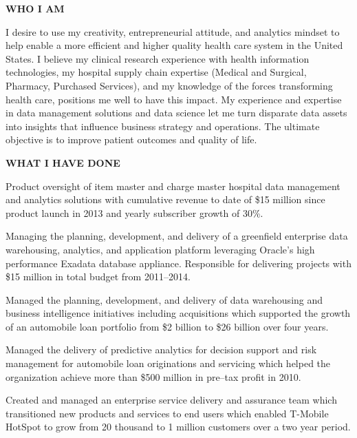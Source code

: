 \documentclass{article}
\newcommand{\sbt}{\,\begin{picture}(-1,1)(-1,-3)\circle*{3}\end{picture}\ }
\newenvironment{tightcenter}{%
  \setlength\topsep{0pt}
  \setlength\parskip{10pt}
  \begin{center}
}{%
  \end{center}
}
\begin{document}
\begin{tightcenter}
{\bfseries \large WHO I AM}
\end{tightcenter}

\noindent
I desire to use my creativity, entrepreneurial attitude, and analytics mindset to help enable a more efficient and higher quality health care system in the United States. I believe my clinical research experience with health information technologies, my hospital supply chain expertise (Medical and Surgical, Pharmacy, Purchased Services), and my knowledge of the forces transforming health care,  positions me well to have this impact. My experience and expertise in data management solutions and data science let me turn disparate data assets into insights that influence business strategy and operations. The ultimate objective is to improve patient outcomes and quality of life.

\begin{tightcenter}
{\bfseries \large WHAT I HAVE DONE}
\end{tightcenter}

\begin{compactitem}

\item[\sbt] Product oversight of item master and charge master hospital data management and analytics solutions with cumulative revenue to date of \$15 million since product launch in 2013 and yearly subscriber growth of 30\%.
\item[\sbt] Managing the planning, development, and delivery of a greenfield enterprise data warehousing, analytics, and application platform leveraging Oracle's high performance Exadata database appliance. Responsible for delivering projects with \$15 million in total budget from 2011--2014.
\item[\sbt] Managed the planning, development, and delivery of data warehousing and business intelligence initiatives including acquisitions which supported the growth of an automobile loan portfolio from \$2 billion to \$26 billion over four years.
\item[\sbt] Managed the delivery of predictive analytics for decision support and risk management for automobile loan originations and servicing which helped the organization achieve more than \$500 million in pre--tax profit in 2010.
\item[\sbt] Created and managed an enterprise service delivery and assurance team which transitioned new products and services to end users which enabled T-Mobile HotSpot to grow from 20 thousand to 1 million customers over a two year period.

\end{compactitem}
\end{document}
